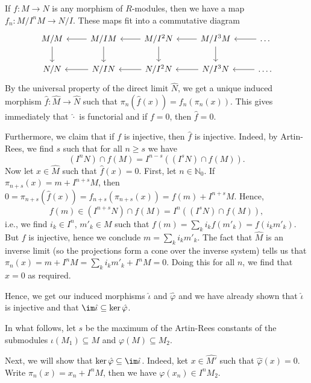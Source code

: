 If $f\colon M\to N$ is any morphism of $R$-modules, then we have a map
$f_n\colon M/I^nM \to N/I$. These maps fit into a commutative diagram
\[\begin{tikzcd}
	M/M\ar[d] & M/IM\ar[l]\ar[d] & M/I^2N\ar[d]\ar[l] & M/I^3M\ar[l]\ar[d] & \ldots\ar[l]\\
	N/N & N/IN\ar[l] & N/I^2N\ar[l] & N/I^3N\ar[l] & \ldots\ar[l].
\end{tikzcd}\]
By the universal property of the direct limit $\hat{N} $, we get a unique induced morphism
$\hat{f}\colon \hat{M}\to \hat{N}$ such that $\pi_n(\hat{f}(x)) = f_n(\pi_n(x))$.
This gives immediately that $\hat{\cdot}$ is functorial and if $f = 0$, then
$\hat{f} = 0$.

Furthermore, we claim that if $f$ is injective, then $\hat{f}$ is injective. Indeed,
by Artin-Rees, we find $s$ such that for all $n\geq s$ we have
\[ (I^nN)\cap f(M) = I^{n-s}((I^sN)\cap f(M)). \]
Now let $x \in \hat{M}$ such that $\hat{f}(x) = 0$. First, let $n \in \mathbb{N}_0$.
If $\pi_{n + s}(x) = m + I^{n + s}M$, then $0 = \pi_{n + s}(\hat{f}(x)) = f_{n + s}(\pi_{n + s}(x)) = f(m) + I^{n + s}M$.
Hence,
\[ f(m) \in (I^{n + s}N) \cap f(M) = I^n((I^sN)\cap f(M)), \]
i.e., we find $i_k \in I^n$, $m'_k \in M$ such that $f(m) = \sum_k i_kf(m'_k) = f(i_km'_k)$. But
$f$ is injective, hence we conclude $m = \sum_k i_k m'_k$. The fact that $\hat{M}$ is an inverse
limit (so the projections form a cone over the inverse system) tells us that
$\pi_n(x) = m + I^nM = \sum_k i_k m'_k + I^nM = 0$. Doing this for all $n$, we find that
$x = 0$ as required.

Hence, we get our induced morphisms $\hat{\iota}$ and $\hat{\varphi}$ and we have
already shown that $\hat{\iota}$ is injective and that $\im\hat{\iota} \subseteq \ker\hat{\varphi}$.

In what follows, let $s$ be the maximum of the Artin-Rees constants of the
submodules $\iota(M_1) \subseteq M$ and $\varphi(M) \subseteq M_2$.

Next, we will show that $\ker\hat{\varphi} \subseteq \im\hat{\iota}$. Indeed,
ket $x \in \hat{M'}$ such that $\hat{\varphi}(x) = 0$. Write
$\pi_n(x) = x_n + I^nM$, then we have $\varphi(x_n) \in I^nM_2$.

